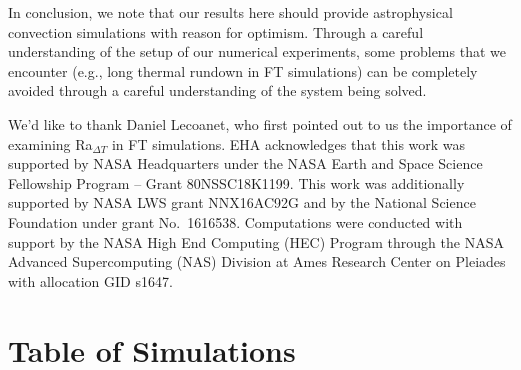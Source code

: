 \documentclass[aps, pre, onecolumn, nofootinbib, notitlepage, groupedaddress, amsfonts, amssymb, amsmath, longbibliography, superscriptaddress]{revtex4-1}
\begin{document}
In conclusion, we note that our results here should provide astrophysical convection simulations with reason for optimism.
Through a careful understanding of the setup of our numerical experiments, some problems that we encounter (e.g., long thermal rundown in FT simulations) can be completely avoided through a careful understanding of the system being solved.

\begin{acknowledgments}
We'd like to thank Daniel Lecoanet, who first pointed out to us the importance of examining Ra$_{\Delta T}$ in FT simulations. 
EHA acknowledges that this work was supported by NASA Headquarters under the NASA Earth and Space Science Fellowship Program -- Grant 80NSSC18K1199.
This work was additionally supported by NASA LWS grant NNX16AC92G and by the National Science Foundation under grant No.~1616538. 
Computations were conducted with support by the NASA High End Computing (HEC) Program through the NASA  Advanced Supercomputing (NAS) Division at Ames Research Center on Pleiades with allocation GID s1647.
\end{acknowledgments}




\appendix
\section{Table of Simulations}
\label{app:table}
\end{document}
